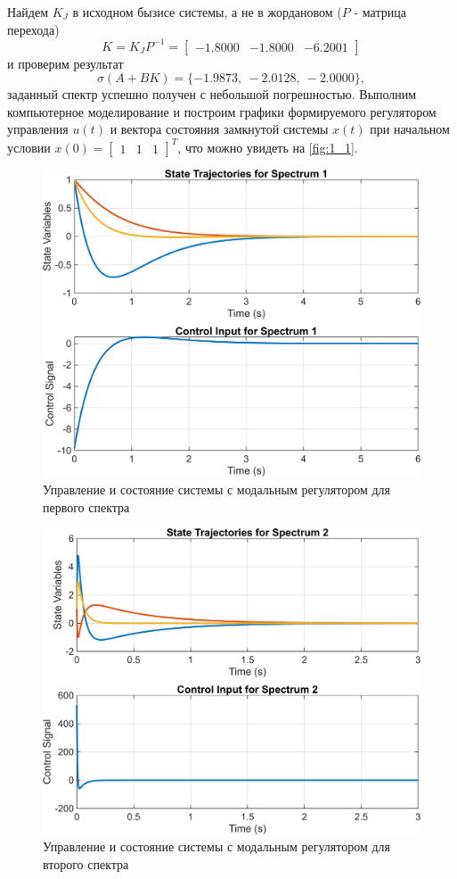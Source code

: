 \noindent Найдем $K_J$ в исходном бызисе
системы, а не в жордановом ($P$ - матрица перехода)
\begin{equation*}
    K=K_JP^{-1}=\begin{bmatrix}
        -1.8000	&-1.8000	&-6.2001
    \end{bmatrix}
\end{equation*}
\noindent и проверим результат
\begin{equation*}
    \sigma(A+BK)=\{-1.9873,\ 
    -2.0128,\ 
    -2.0000\},
\end{equation*}
заданный спектр успешно получен с небольшой погрешностью. 
Выполним компьютерное моделирование и построим графики 
формируемого регулятором управления $u(t)$ и вектора 
состояния замкнутой системы $x(t)$ при начальном условии 
$x(0) =\begin{bmatrix}
    1 & 1 & 1
\end{bmatrix}^T$, что можно увидеть на \autoref{fig:1_1}.

\begin{figure}[H]
    \centering
    \includegraphics[width=0.8\linewidth]{figs/task1_1.png}
    \caption{Управление и состояние системы с модальным регулятором для первого спектра}
    \label{fig:1_1}
\end{figure}

\begin{figure}[H]
    \centering
    \includegraphics[width=0.8\linewidth]{figs/task1_2.png}
    \caption{Управление и состояние системы с модальным регулятором для второго спектра}
    \label{fig:1_2}
\end{figure}

